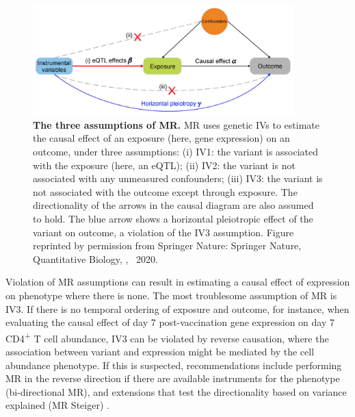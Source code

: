 \begin{figure}
    \centering
    \includegraphics[width=0.9\textwidth,page=1]{mainmatter/figures/chapter_05/zhu2020TranscriptomewideAssociationStudies/Screenshot 2020-11-27 at 22.54.30.png}
    \caption{
        \textbf{The three assumptions of \gls{MR}.} 
        \gls{MR} uses genetic \glspl{IV} to estimate the causal effect \textalpha of an exposure (here, gene expression) on an outcome, under three assumptions:
        (i) IV1: the variant is associated with the exposure (here, an \gls{eQTL});
        (ii) IV2: the variant is not associated with any unmeasured confounders;
        (iii) IV3: the variant is not associated with the outcome except through exposure.
        The directionality of the arrows in the causal diagram are also assumed to hold.
        The blue arrow shows a horizontal pleiotropic effect of the variant on outcome, a violation of the IV3 assumption.
        Figure reprinted by permission from Springer Nature: Springer Nature, Quantitative Biology, \textcite{zhu2020TranscriptomewideAssociationStudies}, \textcopyright~2020.
    }
    \label{fig:discussion_MR_assumptions}
\end{figure}

Violation of \gls{MR} assumptions can result in estimating a causal effect of expression on phenotype where there is none.
The most troublesome assumption of \gls{MR} is IV3.
If there is no temporal ordering of exposure and outcome,
for instance, when evaluating the causal effect of day 7 post-vaccination gene expression on day 7 CD4\textsuperscript{+} T cell abundance,
IV3 can be violated by reverse causation,
where the association between variant and expression might be mediated by the cell abundance phenotype.
If this is suspected, 
recommendations include performing \gls{MR} in the reverse direction if there are available instruments for the phenotype (bi-directional MR),
and extensions that test the directionality based on variance explained (MR Steiger) \autocite{daveysmith2014MendelianRandomizationGenetic,hemani2017OrientingCausalRelationship,hemani2018EvaluatingPotentialRole,neumeyer2020StrengtheningCausalInference}.

